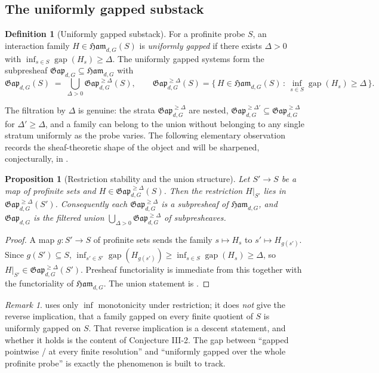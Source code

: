 \documentclass[12pt]{article}
\newcommand{\Ham}{\mathfrak{Ham}}              %
\newcommand{\Gap}{\mathfrak{Gap}}              %
\newcommand{\gapof}[1]{\operatorname{gap}(#1)} %
\newcommand{\gapbound}{\Delta}                  %
\newcommand{\set}[1]{\{\,#1\,\}}
\DeclareMathOperator*{\einf}{inf}
\theoremstyle{plain}
\newtheorem{proposition}[proposition]{Proposition}
\theoremstyle{definition}
\newtheorem{definition}[definition]{Definition}
\theoremstyle{remark}
\newtheorem{remark}[remark]{Remark}
\begin{document}
\subsection{The uniformly gapped substack}
\label{sec:framework-substack}

\begin{definition}[Uniformly gapped substack]
\label{def:gap}
For a profinite probe $S$, an interaction family $H\in\Ham_{d,G}(S)$ is
\emph{uniformly gapped} if there exists $\gapbound>0$ with
$\einf_{s\in S}\gapof{H_s}\ge\gapbound$. The uniformly gapped systems form the
subpresheaf $\Gap_{d,G}\subseteq\Ham_{d,G}$ with
\[
\Gap_{d,G}(S)\;=\;\bigcup_{\gapbound>0}\Gap_{d,G}^{\ge\gapbound}(S),
\qquad
\Gap_{d,G}^{\ge\gapbound}(S)=\set{H\in\Ham_{d,G}(S)\,:\,\einf_{s\in S}\gapof{H_s}\ge\gapbound}.
\]
\end{definition}

The filtration by $\gapbound$ is genuine: the strata $\Gap_{d,G}^{\ge\gapbound}$ are
nested, $\Gap_{d,G}^{\ge\gapbound'}\subseteq\Gap_{d,G}^{\ge\gapbound}$ for
$\gapbound'\ge\gapbound$, and a family can belong to the union without belonging to
any single stratum uniformly as the probe varies. The following elementary
observation records the sheaf-theoretic shape of the object and will be sharpened,
conjecturally, in .

\begin{proposition}[Restriction stability and the union structure]
\label{prop:union}
Let $S'\to S$ be a map of profinite sets and $H\in\Gap_{d,G}^{\ge\gapbound}(S)$. Then
the restriction $H|_{S'}$ lies in $\Gap_{d,G}^{\ge\gapbound}(S')$. Consequently each
$\Gap_{d,G}^{\ge\gapbound}$ is a subpresheaf of $\Ham_{d,G}$, and $\Gap_{d,G}$ is the
filtered union $\bigcup_{\gapbound>0}\Gap_{d,G}^{\ge\gapbound}$ of subpresheaves.
\end{proposition}

\begin{proof}
A map $g:S'\to S$ of profinite sets sends the family $s\mapsto H_s$ to
$s'\mapsto H_{g(s')}$. Since $g(S')\subseteq S$,
$\einf_{s'\in S'}\gapof{H_{g(s')}}\ge\einf_{s\in S}\gapof{H_s}\ge\gapbound$, so
$H|_{S'}\in\Gap_{d,G}^{\ge\gapbound}(S')$. Presheaf functoriality is immediate from
this together with the functoriality of $\Ham_{d,G}$. The union statement is
.
\end{proof}

\begin{remark}
\label{rem:pointwise-vs-uniform}
 uses only $\einf$ monotonicity under restriction; it does
\emph{not} give the reverse implication, that a family gapped on every finite
quotient of $S$ is uniformly gapped on $S$. That reverse implication is a descent
statement, and whether it holds is the content of Conjecture III-2. The gap between
``gapped pointwise / at every finite resolution'' and ``uniformly gapped over the
whole profinite probe'' is exactly the phenomenon  is built to track.
\end{remark}
\end{document}
